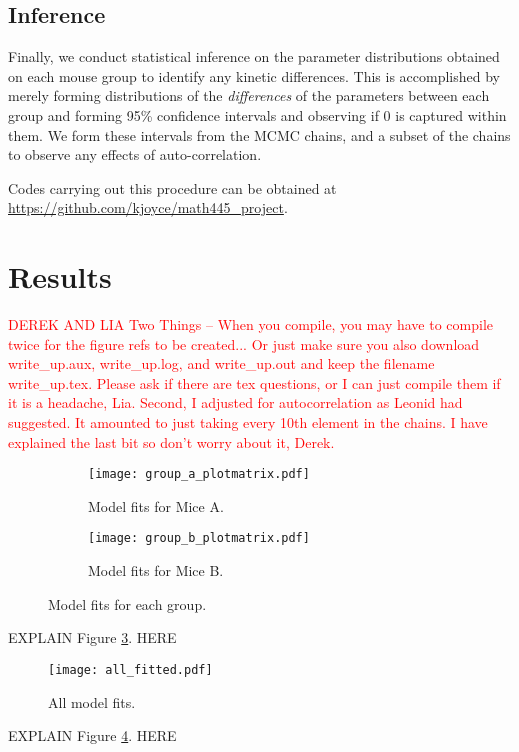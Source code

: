 \documentclass{article}
\newcommand{\figref}[1]{Figure \ref{#1}.}
\begin{document}
\subsection{Inference}

Finally, we conduct statistical inference on the parameter distributions obtained on each mouse group to identify any kinetic differences.  This is accomplished by merely forming distributions of the \emph{differences} of the parameters between each group and forming 95\% confidence intervals and observing if 0 is captured within them.  We form these intervals from the MCMC chains, and a subset of the chains to observe any effects of auto-correlation.

Codes carrying out this procedure can be obtained at \url{https://github.com/kjoyce/math445_project}.
  
\section{Results} 
\textcolor{red}{\Large DEREK AND LIA
Two Things -- When you compile, you may have to compile twice for the figure refs to be created... Or just make sure you also download write\_up.aux, write\_up.log, and write\_up.out and keep the filename write\_up.tex. Please ask if there are tex questions, or I can just compile them if it is a headache, Lia.  Second, I adjusted for autocorrelation as Leonid had suggested.  It amounted to just taking every 10th element in the chains.  I have explained the last bit so don't worry about it, Derek.
}

\begin{figure}[H]
  \begin{subfigure}[b]{.45\textwidth}
    \texttt{[image: group\_a\_plotmatrix.pdf]}
    \caption{Model fits for Mice A.}
    \label{fits:a}
  \end{subfigure}
  \begin{subfigure}[b]{.45\textwidth}
    \texttt{[image: group\_b\_plotmatrix.pdf]}
    \caption{Model fits for Mice B.}
    \label{fits:a}
  \end{subfigure}
  \caption{Model fits for each group.}
  \label{fits}
\end{figure}
EXPLAIN \figref{fits} HERE

\begin{figure}[H]
  \texttt{[image: all\_fitted.pdf]}
  \caption{All model fits.}
  \label{allfit}
\end{figure}
EXPLAIN \figref{allfit} HERE
\end{document}
